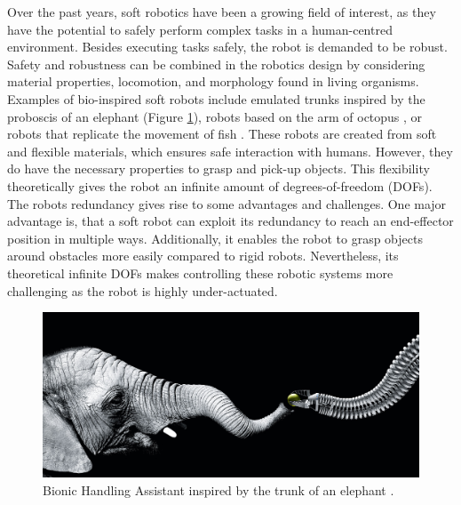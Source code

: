 Over the past years, soft robotics have been a growing field of interest, as they have the potential to safely perform complex tasks in a human-centred environment. Besides executing tasks safely, the robot is demanded to be robust. Safety and robustness can be combined in the robotics design by considering material properties, locomotion, and morphology found in living organisms. Examples of bio-inspired soft robots include emulated trunks \cite{hannan2003kinematics} inspired by the proboscis of an elephant (Figure \ref{fig:BHA}), robots based on the arm of octopus \cite{wang2013visual}, or robots that replicate the movement of fish \cite{marchese2014autonomous}. These robots are created from soft and flexible materials, which ensures safe interaction with humans. However, they do have the necessary properties to grasp and pick-up objects. This flexibility theoretically gives the robot an infinite amount of degrees-of-freedom (DOFs). The robots redundancy gives rise to some advantages and challenges. One major advantage is, that a soft robot can exploit its redundancy to reach an end-effector position in multiple ways. Additionally, it enables the robot to grasp objects around obstacles more easily compared to rigid robots. Nevertheless, its theoretical infinite DOFs makes controlling these robotic systems more challenging as the robot is highly under-actuated. 




\begin{figure}[H]
    \centering
    \includegraphics[width = \textwidth]{Figures/BHAelephant.jpg}
    \caption{Bionic Handling Assistant inspired by the trunk of an elephant \cite{BHA}.}
    \label{fig:BHA}
\end{figure}

